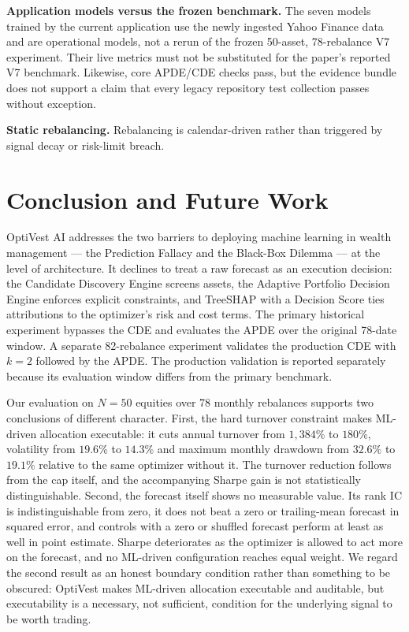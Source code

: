 \documentclass[conference]{IEEEtran}
\begin{document}
\textbf{Application models versus the frozen benchmark.} The seven models
trained by the current application use the newly ingested Yahoo Finance
data and are operational models, not a rerun of the frozen 50-asset,
78-rebalance V7 experiment. Their live metrics must not be substituted for
the paper's reported V7 benchmark. Likewise, core APDE/CDE checks pass, but
the evidence bundle does not support a claim that every legacy repository
test collection passes without exception.

\textbf{Static rebalancing.} Rebalancing is calendar-driven rather than
triggered by signal decay or risk-limit breach.

\section{Conclusion and Future Work}

OptiVest AI addresses the two barriers to deploying machine learning in
wealth management --- the Prediction Fallacy and the Black-Box Dilemma
--- at the level of architecture. It declines to treat a raw forecast as
an execution decision: the Candidate Discovery Engine screens assets,
the Adaptive Portfolio Decision Engine enforces explicit constraints,
and TreeSHAP with a Decision Score ties attributions to the optimizer's
risk and cost terms. The primary historical experiment bypasses the CDE
and evaluates the APDE over the original 78-date window. A separate
82-rebalance experiment validates the production CDE with $k=2$
followed by the APDE. The production validation is reported separately
because its evaluation window differs from the primary benchmark.

Our evaluation on $N{=}50$ equities over 78 monthly rebalances supports
two conclusions of different character. First, the hard turnover
constraint makes ML-driven allocation executable: it cuts annual
turnover from $1{,}384\%$ to $180\%$, volatility from $19.6\%$ to
$14.3\%$ and maximum monthly drawdown from $32.6\%$ to $19.1\%$
relative to the same optimizer without it. The turnover reduction
follows from the cap itself, and the accompanying Sharpe gain is not
statistically distinguishable. Second, the forecast itself shows no
measurable value. Its rank IC is indistinguishable from zero, it does
not beat a zero or trailing-mean forecast in squared error, and
controls with a zero or shuffled forecast perform at least as well in
point estimate. Sharpe deteriorates as the optimizer is allowed to act
more on the forecast, and no ML-driven configuration reaches equal
weight. We regard the second result as an honest boundary condition
rather than something to be obscured: OptiVest makes ML-driven
allocation executable and auditable, but executability is a necessary,
not sufficient, condition for the underlying signal to be worth
trading.
\end{document}
